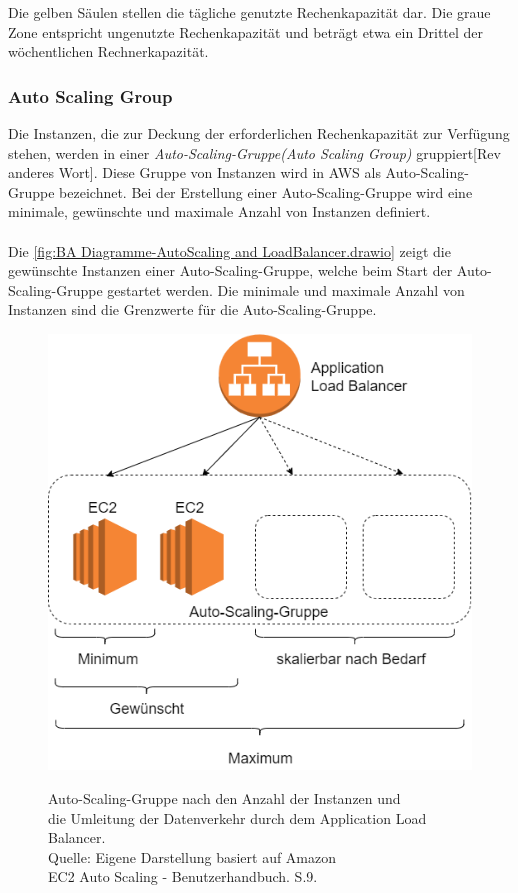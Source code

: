 Die gelben Säulen stellen die tägliche genutzte Rechenkapazität dar.
Die graue Zone entspricht ungenutzte Rechenkapazität und beträgt etwa ein Drittel der wöchentlichen Rechnerkapazität.
\subsubsection*{Auto Scaling Group}
Die Instanzen, die zur Deckung der erforderlichen Rechenkapazität zur Verfügung stehen, werden in einer \textit{Auto-Scaling-Gruppe(Auto Scaling Group)} gruppiert[Rev anderes Wort]. Diese Gruppe von Instanzen wird in AWS als Auto-Scaling-Gruppe bezeichnet. Bei der Erstellung einer Auto-Scaling-Gruppe wird eine minimale, gewünschte und maximale Anzahl von Instanzen definiert. 
\\\\
Die \autoref{fig:BA Diagramme-AutoScaling and LoadBalancer.drawio} zeigt die gewünschte Instanzen einer Auto-Scaling-Gruppe, welche beim Start der Auto-Scaling-Gruppe gestartet werden. Die minimale und maximale Anzahl von Instanzen sind die Grenzwerte für die Auto-Scaling-Gruppe.  
\begin{figure}[h]
  \centering
  \includegraphics[scale=0.5]{sources/BA Diagramme-AutoScaling and LoadBalancer.drawio}
  \caption[Auto-Scaling-Gruppe nach den Anzahl der Instanzen und Umleitung der Datenverkehr durch dem Application Load Balancer]{}
  \label{fig:BA Diagramme-AutoScaling and LoadBalancer.drawio} 
  Auto-Scaling-Gruppe nach den Anzahl der Instanzen und\\ die Umleitung der Datenverkehr durch dem Application Load Balancer.\\
  Quelle: Eigene Darstellung %
  basiert auf Amazon \\
  EC2 Auto Scaling - Benutzerhandbuch. S.9\cite{AMZ31}.
\end{figure}
